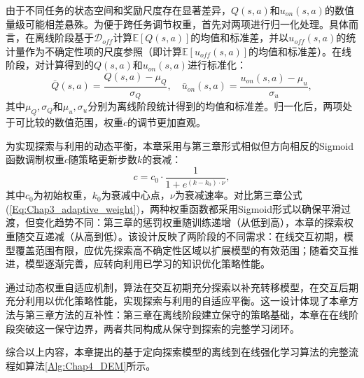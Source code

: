 由于不同任务的状态空间和奖励尺度存在显著差异，$Q(s,a)$和$u_{on}(s,a)$的数值量级可能相差悬殊。为便于跨任务调节权重，首先对两项进行归一化处理。具体而言，在离线阶段基于$\mathcal{D}_{off}$计算$\mathbb{E}[Q(s,a)]$的均值和标准差，并以$u_{off}(s,a)$的统计量作为不确定性项的尺度参照（即计算$\mathbb{E}[u_{off}(s,a)]$的均值和标准差）。在线阶段，对计算得到的$Q(s,a)$和$u_{on}(s,a)$进行标准化：
\begin{equation}\label{Eq:Chap4_normalization}
  \bar{Q}(s,a) = \frac{Q(s,a) - \mu_Q}{\sigma_Q}, \quad \bar{u}_{on}(s,a) = \frac{u_{on}(s,a) - \mu_u}{\sigma_u},
\end{equation}
其中$\mu_Q, \sigma_Q$和$\mu_u, \sigma_u$分别为离线阶段统计得到的均值和标准差。归一化后，两项处于可比较的数值范围，权重$c$的调节更加直观。

为实现探索与利用的动态平衡，本章采用与第三章形式相似但方向相反的Sigmoid函数调制权重$c$随策略更新步数$k$的衰减：
\begin{equation}\label{Eq:Chap4_dynamic_weight}
  c = c_0 \cdot \frac{1}{1 + e^{(k - k_0) \cdot \nu}},
\end{equation}
其中$c_0$为初始权重，$k_0$为衰减中心点，$\nu$为衰减速率。对比第三章公式(\ref{Eq:Chap3_adaptive_weight})，两种权重函数都采用Sigmoid形式以确保平滑过渡，但变化趋势不同：第三章的惩罚权重随训练递增（从低到高），本章的探索权重随交互递减（从高到低）。该设计反映了两阶段的不同需求：在线交互初期，模型覆盖范围有限，应优先探索高不确定性区域以扩展模型的有效范围；随着交互推进，模型逐渐完善，应转向利用已学习的知识优化策略性能。

通过动态权重自适应机制，算法在交互初期充分探索以补充转移模型，在交互后期充分利用以优化策略性能，实现探索与利用的自适应平衡。这一设计体现了本章方法与第三章方法的互补性：第三章在离线阶段建立保守的策略基础，本章在在线阶段突破这一保守边界，两者共同构成从保守到探索的完整学习闭环。

综合以上内容，本章提出的基于定向探索模型的离线到在线强化学习算法的完整流程如算法\ref{Alg:Chap4_DEM}所示。


